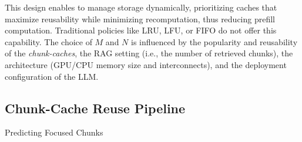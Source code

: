 This design enables \sys to manage storage dynamically, prioritizing caches that maximize reusability while minimizing recomputation, thus reducing prefill computation. Traditional policies like LRU, LFU, or FIFO do not offer this capability. The choice of \(M\) and \(N\) is influenced by the popularity and reusability of the \textit{chunk-caches}, the RAG setting (i.e., the number of retrieved chunks), the architecture (GPU/CPU memory size and interconnects), and the deployment configuration of the LLM.





\subsection{{Chunk-Cache} Reuse Pipeline}
\label{sec:overview_pipeline}






\begin{algorithm}[t]
    \caption{Predicting Focused Chunks}
    \label{algo:predict_focused}
    \end{algorithm}



